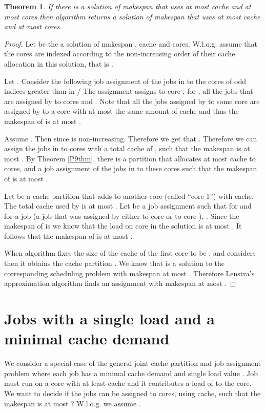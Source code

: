 \documentclass[11pt]{article}
\newtheorem{theorem}{Theorem}[section]
\begin{document}
\begin{theorem}\label{thm_36final}
If there is a solution of makespan  that uses at most  cache and at most  cores then algorithm  returns a solution of makespan  that uses at most  cache and at most  cores.
\end{theorem}
\begin{proof}
Let  be the a solution of makespan ,  cache and  cores. W.l.o.g. assume that the cores
are indexed according to the non-increasing order of their cache allocation in this solution, that is .

Let .
Consider the following job assignment  of the jobs in  to the cores of odd indices greater than  in /
The assignment  assigns to core , for , all the jobs that are assigned by  to cores
 and .
Note that all the jobs
assigned by  to some core are assigned by  to a core with at most the same amount of cache and thus
the makespan of  is at most .

Assume . Then  since  is non-increasing.
Therefore  we get that .
Therefore we can assign the jobs in  to  cores with a total cache of , such that the  makespan is at most .
By Theorem \ref{P9thm}, there is a partition  that allocates at most  cache to  cores, and a job assignment  of the jobs in  to these cores such that the makespan of  is at most .

Let  be a cache partition that adds to   another core (called ``core 1'') with  cache.
The total cache used by  is at most .
Let  be a job assignment such that  for  and
for a job  (a job that was assigned by  either to core  or to core ), .
Since the makespan of  is  we know that the load on core  in the solution  is at most . It follows that the makespan
of  is at most .


When algorithm  fixes the size of the cache of the first core to be , and
considers  then it obtains the cache partition
. We  know that  is a solution to the corresponding scheduling problem with makespan at most .
Therefore Lenstra's approximation algorithm finds an assignment with makespan at most .
\end{proof}

\section{Jobs with a single load and a minimal cache demand}\label{sec_slmc}

We consider a special case of the general joint cache partition and
job assignment  problem where each job has a minimal cache demand
 and single load value . Job  must run on a core with
at least  cache and it contributes a load of  to the core.
We want to decide if the jobs can be assigned to   cores, using  cache, such that the
makespan is at most ? W.l.o.g. we assume .
\end{document}
